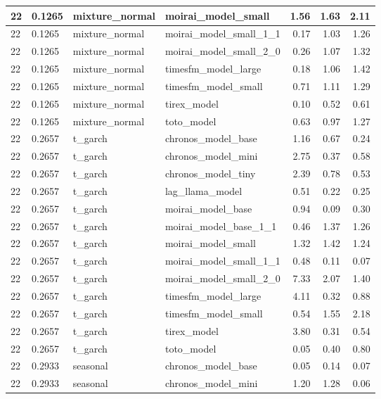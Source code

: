 {\begin{tabular}{llllrrr}
\midrule
22 & 0.1265 & mixture\_normal & moirai\_model\_small & 1.56 & 1.63 & 2.11 \\
\midrule
22 & 0.1265 & mixture\_normal & moirai\_model\_small\_1\_1 & 0.17 & 1.03 & 1.26 \\
\midrule
22 & 0.1265 & mixture\_normal & moirai\_model\_small\_2\_0 & 0.26 & 1.07 & 1.32 \\
\midrule
22 & 0.1265 & mixture\_normal & timesfm\_model\_large & 0.18 & 1.06 & 1.42 \\
\midrule
22 & 0.1265 & mixture\_normal & timesfm\_model\_small & 0.71 & 1.11 & 1.29 \\
\midrule
22 & 0.1265 & mixture\_normal & tirex\_model & 0.10 & 0.52 & 0.61 \\
\midrule
22 & 0.1265 & mixture\_normal & toto\_model & 0.63 & 0.97 & 1.27 \\
\midrule
22 & 0.2657 & t\_garch & chronos\_model\_base & 1.16 & 0.67 & 0.24 \\
\midrule
22 & 0.2657 & t\_garch & chronos\_model\_mini & 2.75 & 0.37 & 0.58 \\
\midrule
22 & 0.2657 & t\_garch & chronos\_model\_tiny & 2.39 & 0.78 & 0.53 \\
\midrule
22 & 0.2657 & t\_garch & lag\_llama\_model & 0.51 & 0.22 & 0.25 \\
\midrule
22 & 0.2657 & t\_garch & moirai\_model\_base & 0.94 & 0.09 & 0.30 \\
\midrule
22 & 0.2657 & t\_garch & moirai\_model\_base\_1\_1 & 0.46 & 1.37 & 1.26 \\
\midrule
22 & 0.2657 & t\_garch & moirai\_model\_small & 1.32 & 1.42 & 1.24 \\
\midrule
22 & 0.2657 & t\_garch & moirai\_model\_small\_1\_1 & 0.48 & 0.11 & 0.07 \\
\midrule
22 & 0.2657 & t\_garch & moirai\_model\_small\_2\_0 & 7.33 & 2.07 & 1.40 \\
\midrule
22 & 0.2657 & t\_garch & timesfm\_model\_large & 4.11 & 0.32 & 0.88 \\
\midrule
22 & 0.2657 & t\_garch & timesfm\_model\_small & 0.54 & 1.55 & 2.18 \\
\midrule
22 & 0.2657 & t\_garch & tirex\_model & 3.80 & 0.31 & 0.54 \\
\midrule
22 & 0.2657 & t\_garch & toto\_model & 0.05 & 0.40 & 0.80 \\
\midrule
22 & 0.2933 & seasonal & chronos\_model\_base & 0.05 & 0.14 & 0.07 \\
\midrule
22 & 0.2933 & seasonal & chronos\_model\_mini & 1.20 & 1.28 & 0.06 \\

\end{tabular}}
